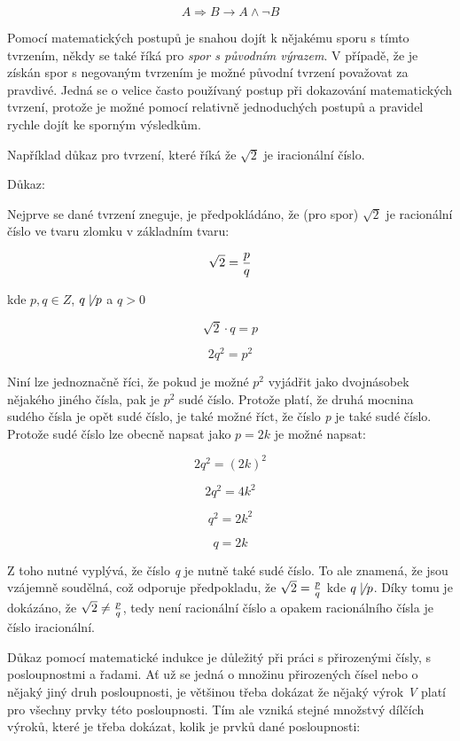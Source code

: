 $$A\Rightarrow B \rightarrow A \wedge \neg B $$

Pomocí matematických postupů je snahou dojít k nějakému sporu s tímto tvrzením, někdy se také říká pro {\it spor s původním výrazem}. V případě, že je získán spor s negovaným tvrzením je možné původní tvrzení považovat za pravdivé. Jedná se o velice často používaný postup při dokazování matematických tvrzení, protože je možné pomocí relativně jednoduchých postupů a pravidel rychle dojít ke sporným výsledkům.

Například důkaz pro tvrzení, které říká že $\sqrt {2}$ je iracionální číslo.

Důkaz:

Nejprve se dané tvrzení zneguje, je předpokládáno, že (pro spor) $\sqrt {2}$ je racionální číslo ve tvaru zlomku v základním tvaru:

$$\sqrt {2} = {p\over q}$$

kde $p,q \in Z$, $q \not\mid p$ a $q > 0$

$$ \sqrt{2} \cdot q = p $$

$$ 2 q^2 = p^2 $$


Niní lze jednoznačně říci, že pokud je možné $p^2$ vyjádřit jako dvojnásobek nějakého jiného čísla, pak je $p^2$ sudé číslo. Protože platí, že druhá mocnina sudého čísla je opět sudé číslo, je také možné říct, že číslo {\it p} je také sudé číslo. Protože sudé číslo lze obecně napsat jako $p=2k$ je možné napsat:

$$ 2 q^2 = (2k)^2$$

$$ 2 q^2 = 4k^2$$

$$q^2 = 2k^2  $$

$$ q = 2k $$

Z toho nutné vyplývá, že číslo {\it q} je nutně také sudé číslo. To ale znamená, že jsou vzájemně soudělná, což odporuje předpokladu, že $\sqrt{2} ={p\over q}$ kde $q \not\mid p$. Díky tomu je dokázáno, že $\sqrt{2} \not = {p\over q}$, tedy není racionální číslo a opakem racionálního čísla je číslo iracionální.  




Důkaz pomocí matematické indukce je důležitý při práci s přirozenými čísly, s posloupnostmi a řadami. Ať už se jedná o množinu přirozených čísel nebo o nějaký jiný druh posloupnosti, je většinou třeba dokázat že nějaký výrok {\it V} platí pro všechny prvky této posloupnosti. Tím ale vzniká stejné množstvý dílčích výroků, které je třeba dokázat, kolik je prvků dané posloupnosti:

